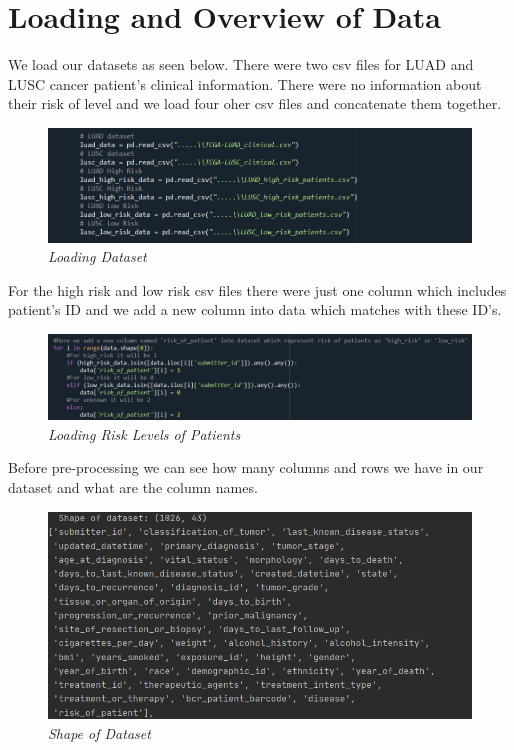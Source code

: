 \documentclass[onecolumn]{article}
\begin{document}
\section{Loading and Overview of Data}
We load our datasets as seen below. There were two csv files for LUAD and LUSC cancer patient's clinical information. There were no information about their risk of level and we load four oher csv files and concatenate them together.
\begin{figure}[h]
\includegraphics[scale=0.7]{load_dataset.png}
\caption{\emph{Loading Dataset}}
\centering
\end{figure}
\bigbreak

For the high risk and low risk csv files there were just one column which includes patient's ID and we add a new column into data which matches with these ID's.
\begin{figure}[h]
\includegraphics[scale=0.7]{risk_of_patient.png}
\caption{\emph{Loading Risk Levels of Patients}}
\centering
\end{figure}
\clearpage
Before pre-processing we can see how many columns and rows we have in our dataset and what are the column names.
\begin{figure}[h]
\includegraphics[scale=0.6]{shapee.png}
\caption{\emph{Shape of Dataset}}
\centering
\end{figure}
\end{document}
